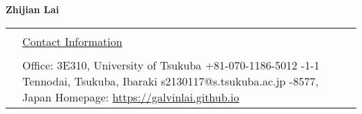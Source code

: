 \documentclass[a4paper,11pt]{article}
\newcommand{\headingfont}{\LARGE \MakeUppercase }
\newenvironment{SectionTable}[1]{
	\renewcommand*{\arraystretch}{1.0}
	\setlength{\tabcolsep}{10pt}
	\begin{longtable}{Rp{5.2in}} 
		\rule{2.3cm}{4pt} 
		& \underline{#1} \\ %
	}
	{
	\end{longtable}\vspace{-.3cm}
}
\begin{document}
	

\thispagestyle{plain}  %


\begin{center}
	{\Huge \bf Zhijian Lai} 
\end{center}
\begin{SectionTable}{\headingfont Contact Information} 
	&
	Office: 3E310, University of Tsukuba \hfill +81-070-1186-5012 -1-1 Tennodai, Tsukuba, Ibaraki \hfill s2130117@s.tsukuba.ac.jp -8577, Japan  \hfill 
	Homepage: \href{https://galvinlai.github.io}{https://galvinlai.github.io}	
\end{SectionTable}





\end{document}
